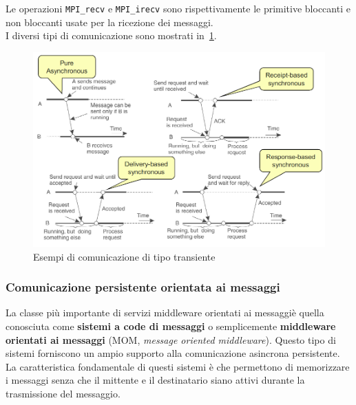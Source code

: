 Le operazioni \texttt{MPI\_recv} e \texttt{MPI\_irecv} sono rispettivamente le primitive bloccanti e non bloccanti usate per la ricezione dei messaggi.\\
I diversi tipi di comunicazione sono mostrati in \figurename\,\ref{img:tranmpi}.
\begin{figure}
\centering
\includegraphics[scale=0.5]{img/tranmpi.png}
\caption{Esempi di comunicazione di tipo transiente}\label{img:tranmpi}
\end{figure}
\subsubsection{Comunicazione persistente orientata ai messaggi}
La classe più importante di servizi middleware orientati ai messaggiè quella conosciuta come \textbf{sistemi a code di messaggi} o semplicemente \textbf{middleware orientati ai messaggi} (MOM, \emph{message oriented middleware}). Questo tipo di sistemi forniscono un ampio supporto alla comunicazione asincrona persistente. La caratteristica fondamentale di questi sistemi è che permettono di memorizzare i messaggi senza che il mittente e il destinatario siano attivi durante la trasmissione del messaggio. 
